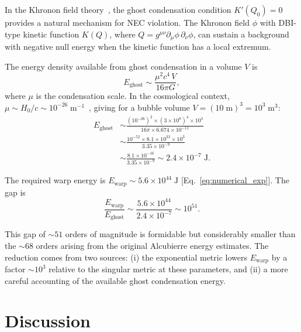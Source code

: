 \documentclass[prd,twocolumn,superscriptaddress,longbibliography]{revtex4-2}
\newcommand{\Ewarp}{E_{\mathrm{warp}}}
\begin{document}
In the Khronon field theory~\cite{BS2024,AHCLM2004}, the ghost
condensation condition $K'(Q_0) = 0$ provides a natural mechanism
for NEC violation.  The Khronon field
$\phi$ with DBI-type kinetic function $K(Q)$, where
$Q = g^{\mu\nu}\partial_\mu\phi\,\partial_\nu\phi$, can sustain
a background with negative null energy when the kinetic function
has a local extremum.

The energy density available from ghost condensation in a volume
$V$ is~\cite{AHCLM2004}
\begin{equation}
E_{\mathrm{ghost}} \sim \frac{\mu^2 c^4\,V}{16\pi G},
\label{eq:Eghost}
\end{equation}
where $\mu$ is the condensation scale.  In the cosmological context,
$\mu \sim H_0/c \sim 10^{-26}\;\mathrm{m}^{-1}$~\cite{Huang2026c},
giving for a bubble volume $V = (10\;\mathrm{m})^3 = 10^3\;\mathrm{m}^3$:
\begin{align}
E_{\mathrm{ghost}} &\sim \frac{(10^{-26})^2 \times (3\times 10^8)^4
\times 10^3}{16\pi \times 6.674\times 10^{-11}}
\nonumber\\
&\sim \frac{10^{-52}\times 8.1\times 10^{33} \times 10^3}
{3.35\times 10^{-9}}
\nonumber\\
&\sim \frac{8.1\times 10^{-16}}{3.35\times 10^{-9}}
\sim 2.4\times 10^{-7}\;\mathrm{J}.
\label{eq:Eghost_num}
\end{align}

The required warp energy is $\Ewarp \sim 5.6\times 10^{44}\;\mathrm{J}$
[Eq.~\eqref{eq:numerical_exp}].  The gap is
\begin{equation}
\frac{\Ewarp}{E_{\mathrm{ghost}}} \sim
\frac{5.6\times 10^{44}}{2.4\times 10^{-7}} \sim 10^{51}.
\label{eq:gap}
\end{equation}

This gap of $\sim 51$ orders of magnitude is formidable but
considerably smaller than the $\sim 68$ orders arising from the
original Alcubierre energy estimates.  The reduction comes from two
sources: (i) the exponential metric lowers $\Ewarp$ by a factor
$\sim 10^{3}$ relative to the singular metric at these parameters,
and (ii) a more careful accounting of the available ghost condensation
energy.

\section{Discussion}
\label{sec:discussion}
\end{document}
